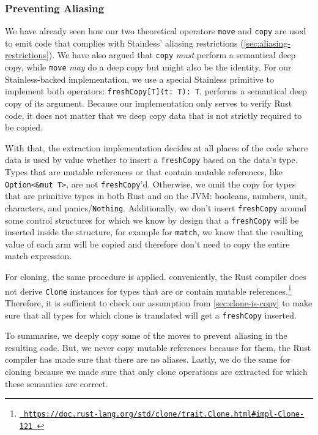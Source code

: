 \subsubsection{Preventing Aliasing}

We have already seen how our two theoretical operators \lstinline!move! and
\lstinline!copy! are used to emit code that complies with Stainless' aliasing
restrictions (\autoref{sec:aliasing-restrictions}). We have also argued that
\lstinline!copy! \emph{must} perform a semantical deep copy, while
\lstinline!move! \emph{may} do a deep copy but might also be the identity. For
our Stainless-backed implementation, we use a special Stainless primitive to
implement both operators: \lstinline!freshCopy[T](t: T): T!, performs a
semantical deep copy of its argument. Because our implementation only serves to
verify Rust code, it does not matter that we deep copy data that is not strictly
required to be copied.

With that, the extraction implementation decides at all places of the code where
data is used by value whether to insert a \lstinline!freshCopy! based on the
data's type. Types that are mutable references or that contain mutable
references, like \lstinline!Option<&mut T>!, are not \lstinline!freshCopy!'d.
Otherwise, we omit the copy for types that are primitive types in both Rust and
on the JVM: booleans, numbers, unit, characters, and panics/\lstinline!Nothing!.
Additionally, we don't insert \lstinline!freshCopy! around some control
structures for which we know by design that a \lstinline!freshCopy! will be
inserted inside the structure, for example for \lstinline!match!, we know that
the resulting value of each arm will be copied and therefore don't need to copy
the entire match expression.

For cloning, the same procedure is applied. conveniently, the Rust compiler does
not derive \lstinline!Clone! instances for types that are or contain mutable
references.\footnote{\href{}{\texttt{\color{MidnightBlue}
https://doc.rust-lang.org/std/clone/trait.Clone.html\#impl-Clone-121 }}}
Therefore, it is sufficient to check our assumption from
\autoref{sec:clone-is-copy} to make sure that all types for which clone is
translated will get a \lstinline!freshCopy! inserted.

To summarise, we deeply copy some of the moves to prevent aliasing in the
resulting code. But, we never copy mutable references because for them, the Rust
compiler has made sure that there are no aliases. Lastly, we do the same for
cloning because we made sure that only clone operations are extracted for which
these semantics are correct.




